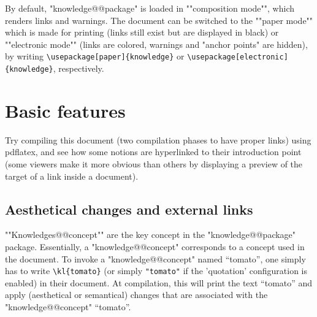 \documentclass{article}
\begin{document}
By default, "knowledge@@package" is loaded in \AP""composition mode"", which renders 
links and warnings. The document can be switched to the \AP""paper mode""
which is made for printing (links still exist but are displayed in black)
or \AP""electronic mode"" (links are colored, warnings and "anchor points"
are hidden), by writing \verb|\usepackage[paper]{knowledge}|
or \verb|\usepackage[electronic]{knowledge}|, respectively.

\section{Basic features}

Try compiling this document (two compilation phases to have proper links) using pdflatex, and see how some notions are hyperlinked to their introduction point (some viewers make it more obvious than others by displaying a preview of the target of a link inside a document).

\subsection{Aesthetical changes and external links}

\AP""Knowledges@@concept"" are the key concept in the "knowledge@@package" 
package. Essentially, a "knowledge@@concept" corresponds to a concept used in 
the document. To invoke a "knowledge@@concept" named ``tomato'', one simply has 
to write \verb|\kl{tomato}| (or simply
%
\verb|"tomato"|%
%
if the 'quotation' 
configuration is enabled) in their document. At compilation, this will 
print the text ``tomato'' and apply (aesthetical or semantical) changes that
are associated with the "knowledge@@concept" ``tomato''.
\end{document}
